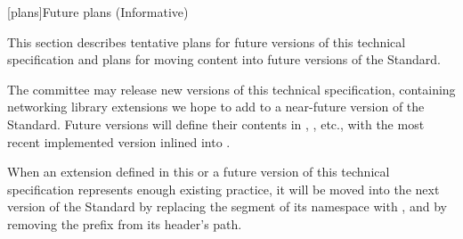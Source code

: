 
[plans]{Future plans (Informative)}

\pnum
This section describes tentative plans for future versions of this technical
specification and plans for moving content into future versions of the \Cpp
Standard.

\pnum
The \Cpp committee may release new versions of this technical specification,
containing networking library extensions we hope to add to a near-future
version of the \Cpp Standard. Future versions will define their contents
in , ,
etc., with the most recent implemented version inlined into
.

\pnum
When an extension defined in this or a future version of this technical
specification represents enough existing practice, it will be moved into
the next version of the \Cpp Standard by replacing the
 segment of its namespace with ,
and by removing the  prefix from its header's path.


